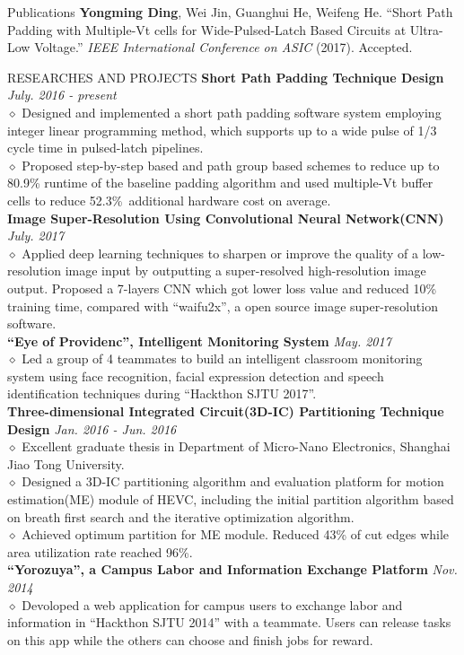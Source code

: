 \documentclass{resume} %
\begin{document}
\begin{rSection}{Publications}
\textbf{Yongming Ding}, Wei Jin, Guanghui He, Weifeng He. ``Short Path Padding with Multiple-Vt cells for Wide-Pulsed-Latch Based Circuits at Ultra-Low Voltage.'' \emph{IEEE International Conference on ASIC}  (2017). Accepted.
\end{rSection}

\begin{rSection}{RESEARCHES AND PROJECTS}
\textbf{Short Path Padding Technique Design} \hfill \emph{July. 2016 - present}
\\$\diamond$ Designed and implemented a short path padding software system employing integer linear programming method, which supports up to a wide pulse of 1/3 cycle time in pulsed-latch pipelines.
\\$\diamond$ Proposed step-by-step based and path group based schemes to reduce up to 80.9\% runtime of the baseline padding algorithm and used multiple-Vt buffer cells to reduce 52.3\%\ additional hardware cost on average. 
\\\textbf{Image Super-Resolution Using Convolutional Neural Network(CNN)} \hfill \emph{July. 2017}
\\$\diamond$  Applied deep learning techniques to sharpen or improve the quality of a low-resolution image input by outputting a super-resolved high-resolution image output. Proposed a 7-layers CNN which got lower loss value and reduced 10\% training time, compared with ``waifu2x'', a open source image super-resolution software.
\\\textbf{``Eye of Providenc'', Intelligent Monitoring System} \hfill \emph{May. 2017}
\\$\diamond$ Led a group of 4 teammates to build an intelligent classroom monitoring system using face recognition, facial expression detection and speech identification techniques during ``Hackthon SJTU 2017''.
\\\textbf{Three-dimensional Integrated Circuit(3D-IC) Partitioning Technique Design} \hfill \emph{Jan. 2016 - Jun. 2016}
\\$\diamond$ Excellent graduate thesis in Department of Micro-Nano Electronics, Shanghai Jiao Tong University.
\\$\diamond$ Designed a 3D-IC partitioning algorithm and evaluation platform for motion estimation(ME) module of HEVC, including the initial partition algorithm based on breath first search and the iterative optimization algorithm.
\\$\diamond$ Achieved optimum partition for ME module. Reduced 43\% of cut edges while area utilization rate reached 96\%.
\\\textbf{``Yorozuya'', a Campus Labor and Information Exchange Platform} \hfill \emph{Nov. 2014}
\\$\diamond$  Devoloped a web application for campus users to exchange labor and information in ``Hackthon SJTU 2014'' with a teammate. Users can release tasks on this app while the others can choose and finish jobs for reward.
\end{rSection}
\end{document}
